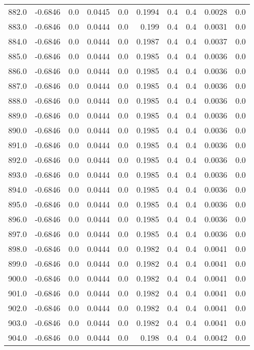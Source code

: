 \begin{longtable}{lrrrrrrrrr}
882.0 & -0.6846 & 0.0 & 0.0445 & 0.0 & 0.1994 & 0.4 & 0.4 & 0.0028 & 0.0 \\
883.0 & -0.6846 & 0.0 & 0.0444 & 0.0 & 0.199 & 0.4 & 0.4 & 0.0031 & 0.0 \\
884.0 & -0.6846 & 0.0 & 0.0444 & 0.0 & 0.1987 & 0.4 & 0.4 & 0.0037 & 0.0 \\
885.0 & -0.6846 & 0.0 & 0.0444 & 0.0 & 0.1985 & 0.4 & 0.4 & 0.0036 & 0.0 \\
886.0 & -0.6846 & 0.0 & 0.0444 & 0.0 & 0.1985 & 0.4 & 0.4 & 0.0036 & 0.0 \\
887.0 & -0.6846 & 0.0 & 0.0444 & 0.0 & 0.1985 & 0.4 & 0.4 & 0.0036 & 0.0 \\
888.0 & -0.6846 & 0.0 & 0.0444 & 0.0 & 0.1985 & 0.4 & 0.4 & 0.0036 & 0.0 \\
889.0 & -0.6846 & 0.0 & 0.0444 & 0.0 & 0.1985 & 0.4 & 0.4 & 0.0036 & 0.0 \\
890.0 & -0.6846 & 0.0 & 0.0444 & 0.0 & 0.1985 & 0.4 & 0.4 & 0.0036 & 0.0 \\
891.0 & -0.6846 & 0.0 & 0.0444 & 0.0 & 0.1985 & 0.4 & 0.4 & 0.0036 & 0.0 \\
892.0 & -0.6846 & 0.0 & 0.0444 & 0.0 & 0.1985 & 0.4 & 0.4 & 0.0036 & 0.0 \\
893.0 & -0.6846 & 0.0 & 0.0444 & 0.0 & 0.1985 & 0.4 & 0.4 & 0.0036 & 0.0 \\
894.0 & -0.6846 & 0.0 & 0.0444 & 0.0 & 0.1985 & 0.4 & 0.4 & 0.0036 & 0.0 \\
895.0 & -0.6846 & 0.0 & 0.0444 & 0.0 & 0.1985 & 0.4 & 0.4 & 0.0036 & 0.0 \\
896.0 & -0.6846 & 0.0 & 0.0444 & 0.0 & 0.1985 & 0.4 & 0.4 & 0.0036 & 0.0 \\
897.0 & -0.6846 & 0.0 & 0.0444 & 0.0 & 0.1985 & 0.4 & 0.4 & 0.0036 & 0.0 \\
898.0 & -0.6846 & 0.0 & 0.0444 & 0.0 & 0.1982 & 0.4 & 0.4 & 0.0041 & 0.0 \\
899.0 & -0.6846 & 0.0 & 0.0444 & 0.0 & 0.1982 & 0.4 & 0.4 & 0.0041 & 0.0 \\
900.0 & -0.6846 & 0.0 & 0.0444 & 0.0 & 0.1982 & 0.4 & 0.4 & 0.0041 & 0.0 \\
901.0 & -0.6846 & 0.0 & 0.0444 & 0.0 & 0.1982 & 0.4 & 0.4 & 0.0041 & 0.0 \\
902.0 & -0.6846 & 0.0 & 0.0444 & 0.0 & 0.1982 & 0.4 & 0.4 & 0.0041 & 0.0 \\
903.0 & -0.6846 & 0.0 & 0.0444 & 0.0 & 0.1982 & 0.4 & 0.4 & 0.0041 & 0.0 \\
904.0 & -0.6846 & 0.0 & 0.0444 & 0.0 & 0.198 & 0.4 & 0.4 & 0.0042 & 0.0 \\

\end{longtable}

